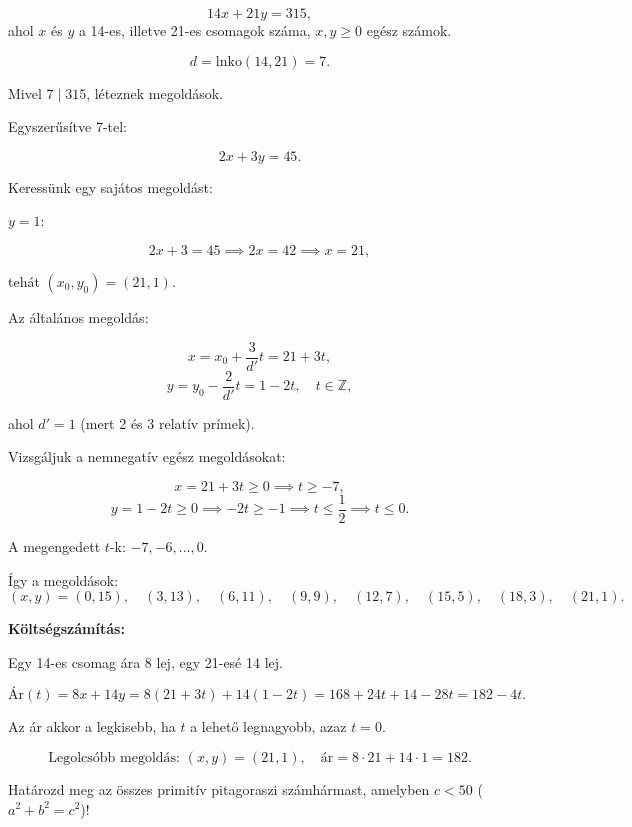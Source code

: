 \begin{solution}
\[
14x+21y=315,
\]
ahol $x$ és $y$ a 14-es, illetve 21-es csomagok száma, $x,y\geq0$
egész számok.

\[
d=\mathrm{lnko}(14,21)=7.
\]

Mivel $7\mid315$, léteznek megoldások.

\bigskip{}

Egyszerűsítve 7-tel:

\[
2x+3y=45.
\]

\bigskip{}

Keressünk egy sajátos megoldást:

$y=1$:

\[
2x+3=45\implies2x=42\implies x=21,
\]

tehát $(x_{0},y_{0})=(21,1)$.

Az általános megoldás:

\[
x=x_{0}+\frac{3}{d'}t=21+3t,
\]
\[
y=y_{0}-\frac{2}{d'}t=1-2t,\quad t\in\mathbb{Z},
\]

ahol $d'=1$ (mert 2 és 3 relatív prímek).

\bigskip{}

Vizsgáljuk a nemnegatív egész megoldásokat:

\[
x=21+3t\geq0\implies t\geq-7,
\]
\[
y=1-2t\geq0\implies-2t\geq-1\implies t\leq\frac{1}{2}\implies t\leq0.
\]

\bigskip{}

A megengedett $t$-k: $-7,-6,\ldots,0$.

\bigskip{}

Így a megoldások: 
\[
(x,y)=(0,15),\quad(3,13),\quad(6,11),\quad(9,9),\quad(12,7),\quad(15,5),\quad(18,3),\quad(21,1).
\]

\textbf{Költségszámítás:}

Egy 14-es csomag ára 8 lej, egy 21-esé 14 lej.

\[
\text{Ár}(t)=8x+14y=8(21+3t)+14(1-2t)=168+24t+14-28t=182-4t.
\]

Az ár akkor a legkisebb, ha $t$ a lehető legnagyobb, azaz $t=0$.

\[
\text{Legolcsóbb megoldás: }(x,y)=(21,1),\quad\text{ár}=8\cdot21+14\cdot1=182.
\]
\end{solution}
\begin{problem}
Határozd meg az összes primitív pitagoraszi számhármast, amelyben
$c<50$ ($a^{2}+b^{2}=c^{2}$)! 
\end{problem}

